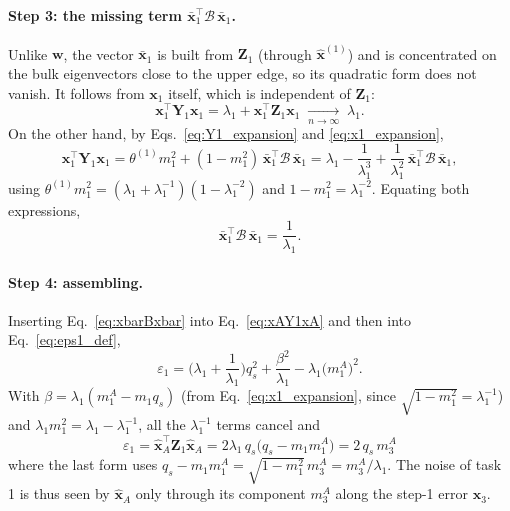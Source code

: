 \paragraph{Step 3: the missing term $\bar{\boldsymbol{x}}_1^\top \mathcal{B}\, \bar{\boldsymbol{x}}_1$.}
Unlike $\boldsymbol{w}$, the vector $\bar{\boldsymbol{x}}_1$ is built from $\mathbf{Z}_1$ (through $\hat{\boldsymbol{x}}^{(1)}$) and is
concentrated on the bulk eigenvectors close to the upper edge, so its quadratic form does not vanish.
It follows from $\boldsymbol{x}_1$ itself, which is independent of $\mathbf{Z}_1$:
\begin{equation}
  \boldsymbol{x}_1^\top \mathbf{Y}_1 \boldsymbol{x}_1 = \lambda_1 + \boldsymbol{x}_1^\top \mathbf{Z}_1 \boldsymbol{x}_1
  \;\xrightarrow[n\to\infty]{}\; \lambda_1 .
\end{equation}
On the other hand, by Eqs.~\eqref{eq:Y1_expansion} and \eqref{eq:x1_expansion},
\begin{equation}
  \boldsymbol{x}_1^\top \mathbf{Y}_1 \boldsymbol{x}_1
  = \theta^{(1)} m_1^2 + (1-m_1^2)\, \bar{\boldsymbol{x}}_1^\top \mathcal{B}\, \bar{\boldsymbol{x}}_1
  = \lambda_1 - \frac{1}{\lambda_1^3} + \frac{1}{\lambda_1^2}\, \bar{\boldsymbol{x}}_1^\top \mathcal{B}\, \bar{\boldsymbol{x}}_1 ,
\end{equation}
using $\theta^{(1)} m_1^2 = (\lambda_1 + \lambda_1^{-1})(1 - \lambda_1^{-2})$ and $1 - m_1^2 = \lambda_1^{-2}$. Equating both expressions,
\begin{equation}
  \bar{\boldsymbol{x}}_1^\top \mathcal{B}\, \bar{\boldsymbol{x}}_1 = \frac{1}{\lambda_1} .
  \label{eq:xbarBxbar}
\end{equation}

\paragraph{Step 4: assembling.}
Inserting Eq.~\eqref{eq:xbarBxbar} into Eq.~\eqref{eq:xAY1xA} and then into Eq.~\eqref{eq:eps1_def},
\begin{equation}
  \varepsilon_1
  = \Big(\lambda_1 + \frac{1}{\lambda_1}\Big) q_s^2 + \frac{\beta^2}{\lambda_1} - \lambda_1 \big(m_1^A\big)^2 .
\end{equation}
With $\beta = \lambda_1 (m_1^A - m_1 q_s)$ (from Eq.~\eqref{eq:x1_expansion}, since $\sqrt{1-m_1^2} = \lambda_1^{-1}$)
and $\lambda_1 m_1^2 = \lambda_1 - \lambda_1^{-1}$, all the $\lambda_1^{-1}$ terms cancel and
\begin{equation}
  \boxed{\;
  \varepsilon_1 = \hat{\boldsymbol{x}}_A^\top \mathbf{Z}_1 \hat{\boldsymbol{x}}_A
  = 2\lambda_1\, q_s\big(q_s - m_1 m_1^A\big)
  = 2\, q_s\, m_3^A
  \;}
  \label{eq:eps1_final}
\end{equation}
where the last form uses $q_s - m_1 m_1^A = \sqrt{1-m_1^2}\, m_3^A = m_3^A/\lambda_1$.
The noise of task 1 is thus seen by $\hat{\boldsymbol{x}}_A$ only through its component $m_3^A$ along the step-1 error $\boldsymbol{x}_3$.

